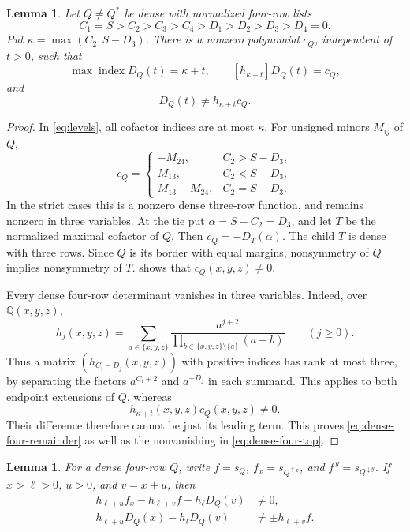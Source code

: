 \documentclass[11pt,a4paper]{amsart}
\numberwithin{equation}{section}
\theoremstyle{plain}
\newtheorem{lemma}[theorem]{Lemma}
\theoremstyle{definition}
\begin{document}
\begin{lemma}\label{lem:dense-four-lower-part}
Let \(Q\ne Q^*\) be dense with normalized four-row lists
\begin{equation}\label{eq:dense-four-lists}
 C_1=S>C_2>C_3>C_4>D_1>D_2>D_3>D_4=0.
\end{equation}
Put \(\kappa=\max(C_2,S-D_3)\).  There is a nonzero polynomial \(c_Q\), independent of \(t>0\), such that
\begin{equation}\label{eq:dense-four-top}
 \max\operatorname{index} D_Q(t)=\kappa+t,
 \qquad [h_{\kappa+t}] D_Q(t)=c_Q,
\end{equation}
and
\begin{equation}\label{eq:dense-four-remainder}
  D_Q(t)\ne h_{\kappa+t}c_Q.
\end{equation}
\end{lemma}

\begin{proof}
In \eqref{eq:levels}, all cofactor indices are at most \(\kappa\).  For unsigned minors \(M_{ij}\) of \(Q\),
\[
 c_Q=\begin{cases}
 -M_{24},&C_2>S-D_3,\\
 M_{13},&C_2<S-D_3,\\
 M_{13}-M_{24},&C_2=S-D_3.
 \end{cases}
\]
In the strict cases this is a nonzero dense three-row function, and remains nonzero in three variables.  At the tie put \(\alpha=S-C_2=D_3\), and let \(T\) be the normalized maximal cofactor of \(Q\).  Then \(c_Q=- D_T(\alpha)\).  The child \(T\) is dense with three rows.  Since \(Q\) is its border with equal margins, nonsymmetry of \(Q\) implies nonsymmetry of \(T\).   shows that \(c_Q(x,y,z)\ne0\).

Every dense four-row determinant vanishes in three variables.  Indeed, over \(\mathbb Q(x,y,z)\),
\[
 h_j(x,y,z)=\sum_{a\in\{x,y,z\}}
 \frac{a^{j+2}}{\prod_{b\in\{x,y,z\}\setminus\{a\}}(a-b)}
 \qquad(j\ge0).
\]
Thus a matrix \((h_{C_i-D_j}(x,y,z))\) with positive indices has rank at most three, by separating the factors \(a^{C_i+2}\) and \(a^{-D_j}\) in each summand.  This applies to both endpoint extensions of \(Q\), whereas
\[
 h_{\kappa+t}(x,y,z)c_Q(x,y,z)\ne0.
\]
Their difference therefore cannot be just its leading term.  This proves \eqref{eq:dense-four-remainder} as well as the nonvanishing in \eqref{eq:dense-four-top}.
\end{proof}

\begin{lemma}\label{lem:dense-cross-resonance}
For a dense four-row \(Q\), write \(f=s_Q\), \(f_x=s_{Q^{\uparrow x}}\), and \(f^{\,y}=s_{Q^{\downarrow y}}\).  If \(x>\ell>0\), \(u>0\), and \(v=x+u\), then
\begin{align}
 h_{\ell+u}f_x-h_{\ell+v}f-h_\ell D_Q(v)&\ne0,
 \label{eq:cross-resonance-one}\\
 h_{\ell+u} D_Q(x)-h_\ell D_Q(v)&\ne\pm h_{\ell+v}f.
 \label{eq:cross-resonance-two}
\end{align}
\end{lemma}
\end{document}
